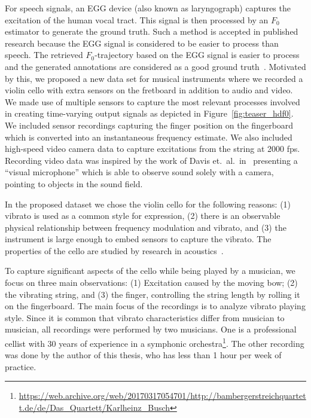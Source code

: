 For speech signals, an EGG device (also known as laryngograph) captures the excitation of the human vocal tract. 
This signal is then processed by an $F_0$ estimator to generate the ground truth. 
Such a method is accepted in published research because the EGG signal is considered to be easier to process than speech. 
The retrieved $F_0$-trajectory based on the EGG signal is easier to process and the generated annotations are considered as a good ground truth~\cite{pirker11, babacan13}.
Motivated by this, we proposed a new data set for musical instruments where we recorded a violin cello with extra sensors on the fretboard in addition to audio and video.
We made use of multiple sensors to capture the most relevant processes involved in creating time-varying output signals as depicted in Figure~\ref{fig:teaser_hdf0}.
We included sensor recordings capturing the finger position on the fingerboard which is converted into an instantaneous frequency estimate.
We also included high-speed video camera data to capture excitations from the string at 2000 fps.
Recording video data was inspired by the work of Davis et.\ al.\ in~\cite{Davis2014VisualMic} presenting a ``visual microphone'' which is able to observe sound solely with a camera, pointing to objects in the sound field. 
\par
In the proposed dataset we chose the violin cello for the following reasons: (1) vibrato is used as a common style for expression, (2) there is an observable physical relationship between frequency modulation and vibrato, and (3) the instrument is large enough to embed sensors to capture the vibrato. The properties of the cello are studied by research in acoustics~\cite{woodhouse04, woodhouse99}.
\par
To capture significant aspects of the cello while being played by a musician, we focus on three main observations: (1) Excitation caused by the moving bow; (2) the vibrating string, and (3) the finger, controlling the string length by rolling it on the fingerboard.
The main focus of the recordings is to analyze vibrato playing style. Since it is common that vibrato characteristics differ from musician to musician, all recordings were performed by two musicians. One is a professional cellist with 30 years of experience in a symphonic orchestra\footnote{\url{https://web.archive.org/web/20170317054701/http://bambergerstreichquartett.de/de/Das_Quartett/Karlheinz_Busch}}.
The other recording was done by the author of this thesis, who has less than 1 hour per week of practice.
\par
